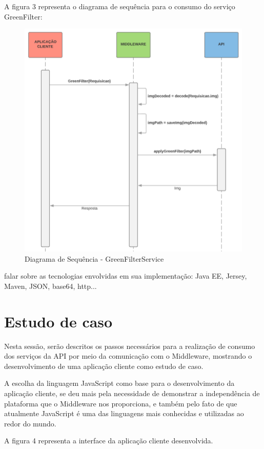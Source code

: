\documentclass[12pt]{article}
\begin{document}
A figura 3 representa o diagrama de sequência para o consumo do serviço GreenFilter:
\begin{figure}[ht]
	\centering
	\includegraphics[width=.7\textwidth]{ds-green-filter.png}
	\caption{Diagrama de Sequência - GreenFilterService}
	\label{fig:Figura3}
\end{figure}


falar sobre as tecnologias envolvidas em sua implementação: Java EE, Jersey, Maven, JSON, base64, http...

\section{Estudo de caso}

Nesta sessão, serão descritos os passos necessários para a realização de consumo dos serviços da API por meio da comunicação com o Middleware, mostrando o desenvolvimento de uma aplicação cliente como estudo de caso.

A escolha da linguagem JavaScript como base para o desenvolvimento da aplicação cliente, se deu mais pela necessidade de demonstrar a independência de plataforma que o Middleware nos proporciona, e também pelo fato de que atualmente JavaScript é uma das linguagens mais conhecidas e utilizadas ao redor do mundo.

A figura 4 representa a interface da aplicação cliente desenvolvida.
\end{document}
